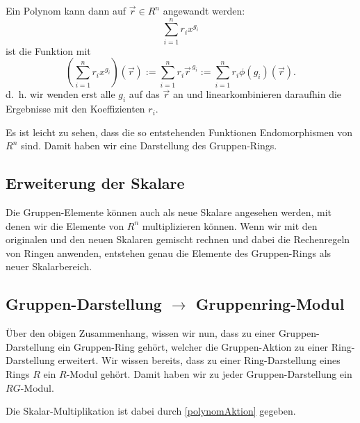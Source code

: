 \documentclass[a4paper]{amsart}
\theoremstyle{definition}
\begin{document}
Ein Polynom kann dann auf \( \vec r \in R^n \) angewandt werden:
\begin{equation}\label{polynomAlsFunktion}
   \sum_{i=1}^n r_i x^{g_i}
\end{equation}
ist die Funktion mit
\begin{equation}\label{polynomAktion}
   \boxed{
      \left( \sum_{i=1}^n r_i x^{g_i} \right) (\vec r) := \sum_{i=1}^n r_i \vec r^{\,g_i} := \sum_{i=1}^n r_i \phi(g_i)(\vec r).
   }
\end{equation}
d.~h. wir wenden erst alle \( g_i \) auf das $\vec r$ an und linearkombinieren daraufhin die Ergebnisse mit den Koeffizienten \( r_i \).

Es ist leicht zu sehen, dass die so entstehenden Funktionen Endomorphismen von \( R^n \) sind. Damit haben wir eine Darstellung des Gruppen-Rings.

\subsection{Erweiterung der Skalare}
Die Gruppen-Elemente können auch als neue Skalare angesehen werden, mit denen wir die Elemente von \( R^n \) multiplizieren können. Wenn wir mit den originalen und den neuen Skalaren gemischt rechnen und dabei die Rechenregeln von Ringen anwenden, entstehen genau die Elemente des Gruppen-Rings als neuer Skalarbereich.

\subsection{Gruppen-Darstellung \( \rightarrow \) Gruppenring-Modul}
Über den obigen Zusammenhang, wissen wir nun, dass zu einer Gruppen-Darstellung ein Gruppen-Ring gehört, welcher die Gruppen-Aktion zu einer Ring-Darstellung erweitert. Wir wissen bereits, dass zu einer Ring-Darstellung eines Rings \( R \) ein \( R \)-Modul gehört. Damit haben wir zu jeder Gruppen-Darstellung ein \( RG \)-Modul.

Die Skalar-Multiplikation ist dabei durch \eqref{polynomAktion} gegeben.
\end{document}
